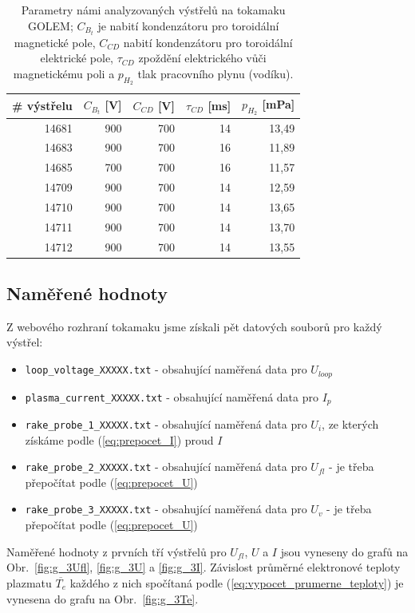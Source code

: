 \documentclass[english]{article}
\begin{document}
\begin{table}[htbp]
  \centering
    \begin{tabular}{|r|r|r|r|r|}
    \hline
    \# výstřelu & $C_{B_t}$ [V] & $C_{CD}$ [V] & $\tau_{CD}$ [ms] & $p_{H_2}$ [mPa] \bigstrut\\
    \hline
    14681 & 900   & 700   & 14    & 13,49 \bigstrut\\
    \hline
    14683 & 900   & 700   & 16    & 11,89 \bigstrut\\
    \hline
    14685 & 700   & 700   & 16    & 11,57 \bigstrut\\
    \hline
    14709 & 900   & 700   & 14    & 12,59 \bigstrut\\
    \hline
    14710 & 900   & 700   & 14    & 13,65 \bigstrut\\
    \hline
    14711 & 900   & 700   & 14    & 13,70 \bigstrut\\
    \hline
    14712 & 900   & 700   & 14    & 13,55 \bigstrut\\
    \hline
    \end{tabular}%
    \caption{Parametry námi analyzovaných výstřelů na tokamaku GOLEM; $C_{B_t}$ je nabití kondenzátoru pro toroidální magnetické pole, $C_{CD}$ nabití kondenzátoru pro toroidální elektrické pole, $\tau_{CD}$ zpoždění elektrického vůči magnetickému poli a $p_{H_2}$ tlak pracovního plynu (vodíku).}
  \label{tab:shotlist}%
\end{table}%
	
	\subsection{Naměřené hodnoty}
			Z webového rozhraní tokamaku jsme získali pět datových souborů pro každý výstřel:
			\begin{itemize}
					\item  \texttt{loop\_voltage\_XXXXX.txt} - obsahující naměřená data pro $U_{loop}$
					\item  \texttt{plasma\_current\_XXXXX.txt} - obsahující naměřená data pro $I_p$		
					\item  \texttt{rake\_probe\_1\_XXXXX.txt} - obsahující naměřená data pro $U_i$, ze kterých získáme podle (\ref{eq:prepocet_I}) proud $I$					
					\item  \texttt{rake\_probe\_2\_XXXXX.txt} - obsahující naměřená data pro $U_{fl}$ - je třeba přepočítat podle (\ref{eq:prepocet_U})
					\item  \texttt{rake\_probe\_3\_XXXXX.txt} - obsahující naměřená data pro $U_v$ - je třeba přepočítat podle (\ref{eq:prepocet_U})										
			\end{itemize}
			Naměřené hodnoty z prvních tří výstřelů pro $U_{fl}$, $U$ a $I$ jsou vyneseny do grafů na Obr.~\ref{fig:g_3Ufl}, \ref{fig:g_3U} a \ref{fig:g_3I}. Závislost průměrné elektronové teploty plazmatu $\overline{T_e}$ každého z nich spočítaná podle (\ref{eq:vypocet_prumerne_teploty}) je vynesena do grafu na Obr.~\ref{fig:g_3Te}. 
			
\end{document}
